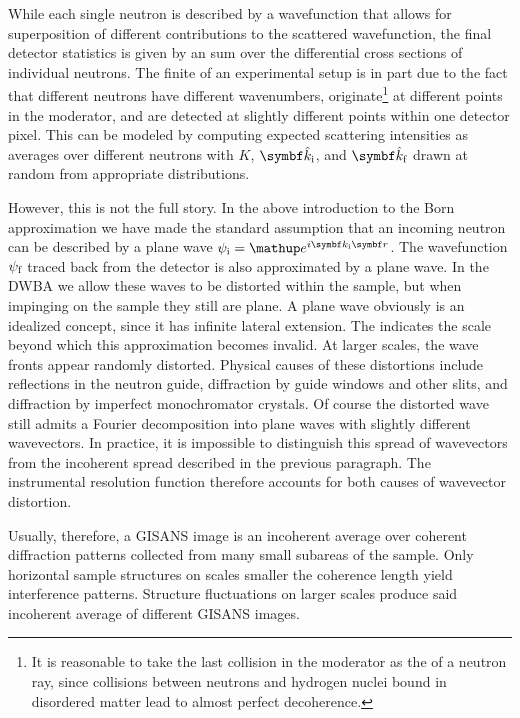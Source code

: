 While each single neutron is described by a wavefunction
that allows for  superposition of
different contributions to the scattered wavefunction,
the final detector statistics
%
is given by an  sum
over the differential cross sections of individual neutrons.
The finite 
%
of an experimental setup is in part due to the fact that
different neutrons have different wavenumbers,
originate\footnote
{It is reasonable to take the last collision in the moderator
  as the  of a neutron ray,
  since collisions between neutrons and hydrogen nuclei bound in
  disordered matter lead to almost perfect decoherence.}
at different points in the moderator,
and are detected at slightly different points within one detector pixel.
This can be modeled by computing expected scattering intensities as
averages over different neutrons with
$K$, $\v{\hat k}_\ti$, and $\v{\hat k}_\tf$ drawn at random
from appropriate distributions.

However, this is not the full story.
In the above introduction to the Born approximation
we have made the standard assumption
that an incoming neutron can be described by a plane wave
$\psi_\ti=\e^{i\k_\ti\r}$.
The wavefunction $\psi_{\text{f}}$ traced back from the detector is also
approximated by a plane wave.
In the DWBA we allow these waves to be distorted within the sample,
but when impinging on the sample they still are plane.
A plane wave obviously is an idealized concept,
since it has infinite lateral extension.
The  indicates the scale
beyond which this approximation becomes invalid.
At larger scales, the wave fronts appear randomly distorted.
Physical causes of these distortions include
reflections in the neutron guide,
diffraction by guide windows and other slits,
and diffraction by imperfect monochromator crystals.
Of course the distorted wave still admits a Fourier decomposition
into plane waves with slightly different wavevectors.
In practice, it is impossible to distinguish this spread of wavevectors
from the incoherent spread described in the previous paragraph.
The instrumental resolution function therefore
accounts for both causes of wavevector distortion.
%

Usually, therefore, a GISANS image is an incoherent average
over coherent diffraction patterns collected from
many small subareas of the sample.
Only horizontal sample structures on scales smaller the coherence length
yield interference patterns.
Structure fluctuations on larger scales
produce said incoherent average of different GISANS images.

